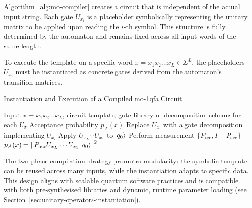 Algorithm~\ref{alg:mo-compiler} creates a circuit that is independent of the actual input string. Each gate $\boxed{U_{x_i}}$ is a placeholder symbolically representing the unitary matrix to be applied upon reading the $i$-th symbol. This structure is fully determined by the automaton and remains fixed across all input words of the same length.

\medskip

To execute the template on a specific word $x = x_1 x_2 \dots x_L \in \Sigma^L$, the placeholders $\boxed{U_{x_i}}$ must be instantiated as concrete gates derived from the automaton's transition matrices.

\begin{algorithm}[H]
\caption{Instantiation and Execution of a Compiled \gls{mo-1qfa} Circuit}
\label{alg:mo-instantiation}
\begin{algorithmic}[1]
\Require Input $x = x_1x_2\dots x_L$, circuit template, gate library or decomposition scheme for each $U_\sigma$
\Ensure Acceptance probability $p_A(x)$
   \State Replace $\boxed{U_{x_i}}$ with a gate decomposition implementing $U_{x_i}$
\EndFor
\State Apply $U_{x_L} \cdots U_{x_1}$ to $\ket{q_0}$
\State Perform measurement $\{P_{\text{acc}}, I - P_{\text{acc}}\}$
\State \Return $p_A(x) = \left\|P_{\text{acc}} U_{x_L} \cdots U_{x_1} \ket{q_0}\right\|^2$
\end{algorithmic}
\end{algorithm}

The two-phase compilation strategy promotes modularity: the symbolic template can be reused across many inputs, while the instantiation adapts to specific data. This design aligns with scalable quantum software practices and is compatible with both pre-synthesised libraries and dynamic, runtime parameter loading (see Section~\ref{sec:unitary-operators-instantiation}).


